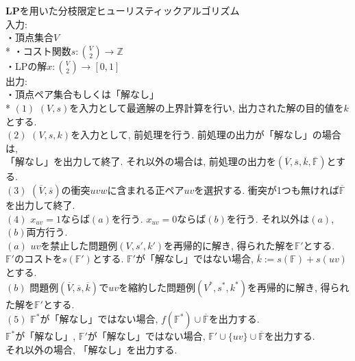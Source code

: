 \documentclass[10.5,a4paper,titlepage, dvipdfmx]{bxjsarticle}
\begin{document}
\begin{screen}
    $\textbf{LPを用いた分枝限定ヒューリスティックアルゴリズム}$ \\
    入力: \\
    \hspace{15pt} ・頂点集合$V$\\*
    \hspace{15pt} ・コスト関数$s:\binom{V}{2} \rightarrow \mathbb{Z}$\\
    \hspace{15pt} ・LPの解$x:\binom{V}{2} \rightarrow [0,1]$\\
    出力: \\
    \hspace{15pt} ・頂点ペア集合もしくは「解なし」\\*
    $(1)$ $(V,s)$を入力として最適解の上界計算を行い, 出力された解の目的値を$k$とする.\\
    $(2)$ $(V,s,k)$を入力として, 前処理を行う. 前処理の出力が「解なし」の場合は,\\
    \hspace{15pt}「解なし」を出力して終了. それ以外の場合は, 前処理の出力を$(\overline{V}, \overline{s}, \overline{k}, \overline{\mathbb{F}})$とする.\\
    $(3)$ $(\overline{V},\overline{s})$の衝突$uvw$に含まれる正ペア$uv$を選択する. 衝突が1つも無ければ$\overline{\mathbb{F}}$を出力して終了.\\
    $(4)$ $x_{uv} = 1$ならば$(a)$を行う. $x_{uv}=0$ならば$(b)$を行う. それ以外は$(a)$,$(b)$両方行う.\\
    \hspace{15pt} $(a)$ $uv$を禁止した問題例$(V,s',k')$を再帰的に解き, 得られた解を$\mathbb{F'}$とする.\\
    \hspace{15pt} \hspace{15pt} $\mathbb{F'}$のコストを$s(\mathbb{F'})$とする. $\mathbb{F'}$が「解なし」ではない場合, $\overline{k}:=s(\mathbb{F})+s(uv)$とする.\\
    \hspace{15pt} $(b)$ 問題例$(\overline{V}, \overline{s}, \overline{k})$で$uv$を縮約した問題例$(V^*,s^*,k^*)$を再帰的に解き, 得られた解を$\mathbb{F'}$とする.\\
    $(5)$ $\mathbb{F^*}$が「解なし」ではない場合, $f(\mathbb{F^*}) \cup \overline{\mathbb{F}}$を出力する.\\
    \hspace{15pt}$\mathbb{F^*}$が「解なし」, $\mathbb{F'}$が「解なし」ではない場合, $\mathbb{F'}\cup \{uv\} \cup \overline{\mathbb{F}}$を出力する.\\
    \hspace{15pt}それ以外の場合, 「解なし」を出力する.
\end{screen}
\end{document}
